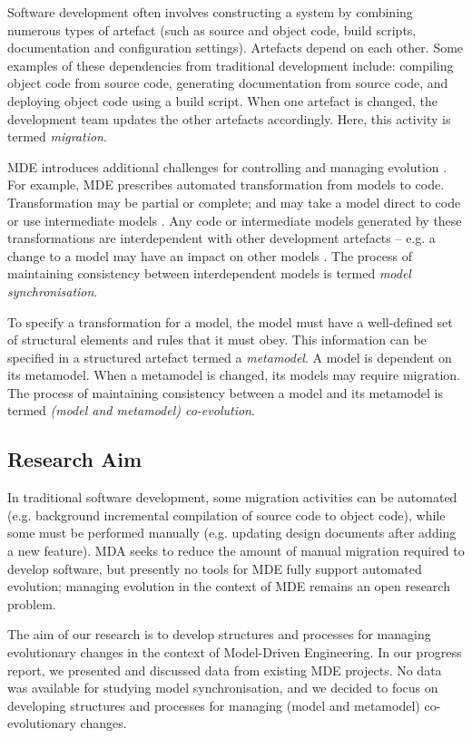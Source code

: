 Software development often involves constructing a system by combining numerous types of artefact (such as source and object code, build scripts, documentation and configuration settings). Artefacts depend on each other. Some examples of these dependencies from traditional development include: compiling object code from source code, generating documentation from source code, and deploying object code using a build script. When one artefact is changed, the development team updates the other artefacts accordingly. Here, this activity is termed \textit{migration}.

MDE introduces additional challenges for controlling and managing evolution \cite{mens07softwareevolution}. For example, MDE prescribes automated transformation from models to code. Transformation may be partial or complete; and may take a model direct to code or use intermediate models \cite{kleppe03mda}. Any code or intermediate models generated by these transformations are interdependent with other development artefacts -- e.g. a change to a model may have an impact on other models \cite{deursen07mdse}. The process of maintaining consistency between interdependent models is termed \textit{model synchronisation}.

To specify a transformation for a model, the model must have a well-defined set of structural elements and rules that it must obey. This information can be specified in a structured artefact termed a \emph{metamodel}. A model is dependent on its metamodel. When a metamodel is changed, its models may require migration. The process of maintaining consistency between a model and its metamodel is termed \textit{(model and metamodel) co-evolution}.

\subsection{Research Aim}
In traditional software development, some migration activities can be automated (e.g. background incremental compilation of source code to object code), while some must be performed manually (e.g. updating design documents after adding a new feature). MDA seeks to reduce the amount of manual migration required to develop software, but presently no tools for MDE fully support automated evolution; managing evolution in the context of MDE remains an open research problem.

The aim of our research is to develop structures and processes for managing evolutionary changes in the context of Model-Driven Engineering. In our progress report, we presented and discussed data from existing MDE projects. No data was available for studying model synchronisation, and we decided to focus on developing structures and processes for managing (model and metamodel) co-evolutionary changes.